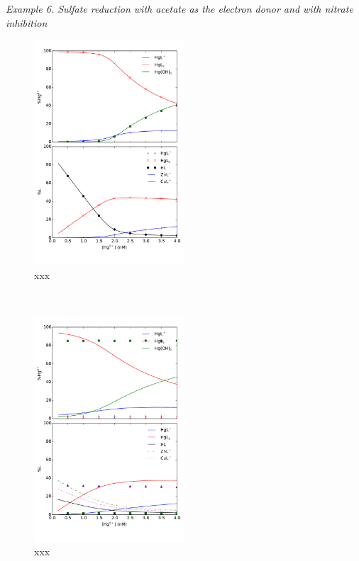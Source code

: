 \documentclass[12pt, a4paper]{article}
\begin{document}
\emph{Example 6. Sulfate reduction with acetate as the electron donor and with nitrate inhibition}
\\
\begin{figure}[h]
\centering
\includegraphics[width=0.5\textwidth]{../pflotran/speciation/Dong2010/ex4/ex40.pdf}
\caption{xxx}
\label{Fig40}
\end{figure}

\\
\begin{figure}[h]
\centering
\includegraphics[width=0.5\textwidth]{../pflotran/speciation/Dong2010/ex4/ex4a.pdf}
\caption{xxx}
\label{Fig4a}
\end{figure}
\end{document}
